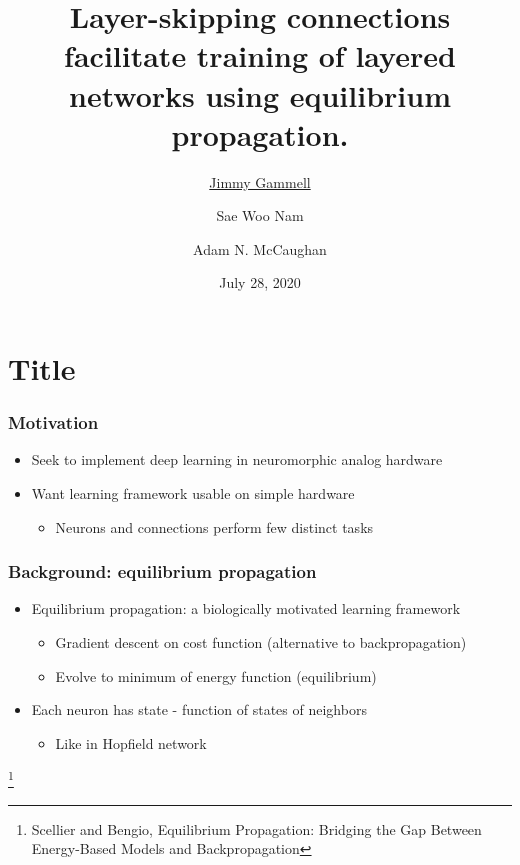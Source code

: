 \documentclass[pdf]{beamer}
\title{Layer-skipping connections facilitate training of layered networks using equilibrium propagation.}
\author{\underline{Jimmy Gammell} \and Sae Woo Nam \and Adam N. McCaughan}
\date{July 28, 2020}
\newcommand\blfootnote[1]{%
\begingroup
\renewcommand\thefootnote{}\footnote{#1}%
\addtocounter{footnote}{-1}%
\endgroup
}
\begin{document}
\section{Title} %
\begin{frame} %
	\titlepage
\end{frame}

\begin{frame}
\frametitle{Motivation}
\begin{itemize}
	\item<1-> Seek to implement deep learning in neuromorphic analog hardware
	\item<2-> Want learning framework usable on simple hardware
	\begin{itemize}
		\item<3-> Neurons and connections perform few distinct tasks
	\end{itemize}
\end{itemize}
\end{frame}

\begin{frame}
\frametitle{Background: equilibrium propagation}
\begin{itemize}
			\item<1-> Equilibrium propagation: a biologically motivated learning framework
			\begin{itemize}
				\item<2-> Gradient descent on cost function (alternative to backpropagation)
				\item<3-> Evolve to minimum of energy function (equilibrium)
			\end{itemize}
			\item<4-> Each neuron has state - function of states of neighbors
			\begin{itemize}
				\item<5-> Like in Hopfield network
			\end{itemize}
\end{itemize}
\blfootnote{Scellier and Bengio, Equilibrium Propagation: Bridging the Gap Between Energy-Based Models and Backpropagation}
\end{frame}
\end{document}
